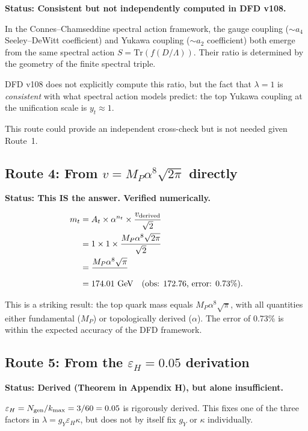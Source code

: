 \documentclass[11pt,a4paper]{article}
\newcommand{\Tr}{\mathrm{Tr}}
\theoremstyle{definition}
\theoremstyle{remark}
\begin{document}
\textbf{Status: Consistent but not independently computed in DFD v108.}

In the Connes--Chamseddine spectral action framework, the gauge coupling
($\sim a_4$ Seeley--DeWitt coefficient) and Yukawa coupling ($\sim a_2$
coefficient) both emerge from the same spectral action
$S = \Tr(f(D/\Lambda))$. Their ratio is determined by the geometry of the
finite spectral triple.

DFD v108 does not explicitly compute this ratio, but the fact that
$\lambda = 1$ is \emph{consistent} with what spectral action models predict:
the top Yukawa coupling at the unification scale is $y_t \approx 1$.

This route could provide an independent cross-check but is not needed
given Route~1.

\subsection{Route 4: From $v = M_P\alpha^8\sqrt{2\pi}$ directly}

\textbf{Status: This IS the answer. Verified numerically.}

\begin{align}
m_t &= A_t \times \alpha^{n_t} \times \frac{v_{\rm derived}}{\sqrt{2}} \\
    &= 1 \times 1 \times \frac{M_P\alpha^8\sqrt{2\pi}}{\sqrt{2}} \\
    &= \frac{M_P\alpha^8\sqrt{\pi}}{\phantom{0}} \\
    &= 174.01~\text{GeV} \quad \text{(obs: 172.76, error: 0.73\%)}.
\end{align}

This is a striking result: the top quark mass equals $M_P\alpha^8\sqrt{\pi}$,
with all quantities either fundamental ($M_P$) or topologically derived
($\alpha$). The error of 0.73\% is within the expected accuracy of the DFD
framework.

\subsection{Route 5: From the $\varepsilon_H = 0.05$ derivation}

\textbf{Status: Derived (Theorem in Appendix H), but alone insufficient.}

$\varepsilon_H = N_{\rm gen}/k_{\max} = 3/60 = 0.05$ is rigorously derived.
This fixes one of the three factors in $\lambda = g_Y\varepsilon_H\kappa$,
but does not by itself fix $g_Y$ or $\kappa$ individually.
\end{document}
